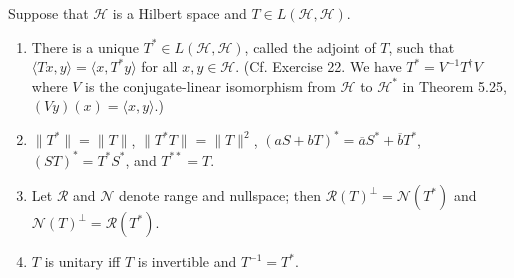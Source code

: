 \documentclass[12pt,a4paper]{article}
\begin{document}
\begin{problem}\label{prob:5-57}
Suppose that $\mathcal{H}$ is a Hilbert space and $T \in L(\mathcal{H},\mathcal{H})$.
\begin{enumerate}[label=\alph*.]
\item There is a unique $T^* \in L(\mathcal{H},\mathcal{H})$, called the adjoint of $T$, such that $\langle Tx,y \rangle = \langle x,T^*y \rangle$ for all $x,y \in \mathcal{H}$. (Cf. Exercise 22. We have $T^* = V^{-1}T^\dagger V$ where $V$ is the conjugate-linear isomorphism from $\mathcal{H}$ to $\mathcal{H}^*$ in Theorem 5.25, $(Vy)(x) = \langle x,y \rangle$.)
\item $\|T^*\| = \|T\|$, $\|T^*T\| = \|T\|^2$, $(aS+bT)^* = \overline{a}S^* + \overline{b}T^*$, $(ST)^* = T^*S^*$, and $T^{**} = T$.
\item Let $\mathcal{R}$ and $\mathcal{N}$ denote range and nullspace; then $\mathcal{R}(T)^\perp = \mathcal{N}(T^*)$ and $\mathcal{N}(T)^\perp = \mathcal{R}(T^*)$.
\item $T$ is unitary iff $T$ is invertible and $T^{-1} = T^*$.
\end{enumerate}
\end{problem}
\end{document}

